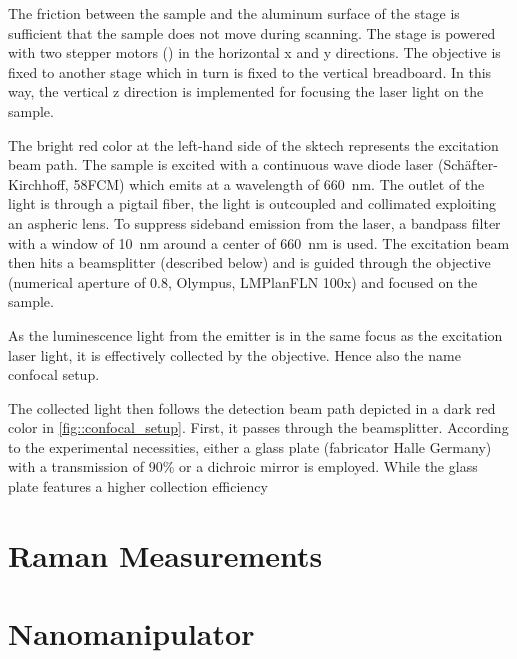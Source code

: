 	The friction between the sample and the aluminum surface of the stage is sufficient that the sample does not move during scanning.
	The stage is powered with two stepper motors () in the horizontal x and y directions.
	The objective is fixed to another stage which in turn is fixed to the vertical breadboard.
	In this way, the vertical z direction is implemented for focusing the laser light on the sample.

	The bright red color at the left-hand side of the sktech represents the excitation beam path.
	The sample is excited with a continuous wave diode laser (Sch\"after-Kirchhoff, 58FCM) which emits at a wavelength of \SI{660}{\nano\meter}.
	The outlet of the light is through a pigtail fiber, the light is outcoupled and collimated exploiting an aspheric lens.
	To suppress sideband emission from the laser, a bandpass filter with a window of  \SI{10}{\nm} around a center of \SI{660}{\nm} is used.
	The excitation beam then hits a beamsplitter (described below) and is guided through the objective (numerical aperture of 0.8, Olympus, LMPlanFLN 100x) and focused on the sample.

	As the luminescence light from the emitter is in the same focus as the excitation laser light, it is effectively collected by the objective.
	Hence also the name confocal setup.

	The collected light then follows the detection beam path depicted in a dark red color in \autoref{fig::confocal_setup}.
	First, it passes through the beamsplitter.
	According to the experimental necessities, either a  glass plate (fabricator Halle Germany) with a transmission of 90\% or a dichroic mirror is employed.
	While the glass plate features a higher collection efficiency 


	\section{Raman Measurements}
	\section{Nanomanipulator}

